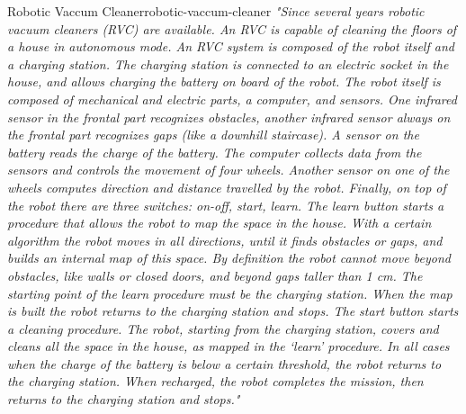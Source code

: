\documentclass[12pt]{article}
\begin{document}
\begin{example}{Robotic Vaccum Cleaner}{robotic-vaccum-cleaner}
  \emph{"Since several years robotic vacuum cleaners (RVC) are available. An RVC is capable of cleaning the floors of a house in autonomous mode. 
An RVC system is composed of the robot itself and a charging station. The charging station is connected to an electric socket in the house, and allows charging the battery on board of the robot.
The robot itself is composed of mechanical and electric parts, a computer, and sensors. One infrared sensor in the frontal part recognizes obstacles, another infrared sensor always on the frontal part recognizes gaps (like a downhill staircase). A sensor on the battery reads the charge of the battery. The computer collects data from the sensors and controls the movement of four wheels. Another sensor on one of the wheels computes direction and distance travelled by the robot.
Finally, on top of the robot there are three switches: on-off, start, learn. 
The learn button starts a procedure that allows the robot to map the space in the house. With a certain algorithm the robot moves in all directions, until it finds obstacles or gaps, and builds an internal map of this space. By definition the robot cannot move beyond obstacles, like walls or closed doors, and beyond gaps taller than 1 cm. 
The starting point of the learn procedure must be the charging station. When the map is built the robot returns to the charging station and stops. 
The start button starts a cleaning procedure. The robot, starting from the charging station, covers and cleans all the space in the house, as mapped in the ‘learn’ procedure.
In all cases when the charge of the battery is below a certain threshold, the robot returns to the charging station. When recharged, the robot completes the mission, then returns to the charging station and stops."}
  

\end{example}
\end{document}
